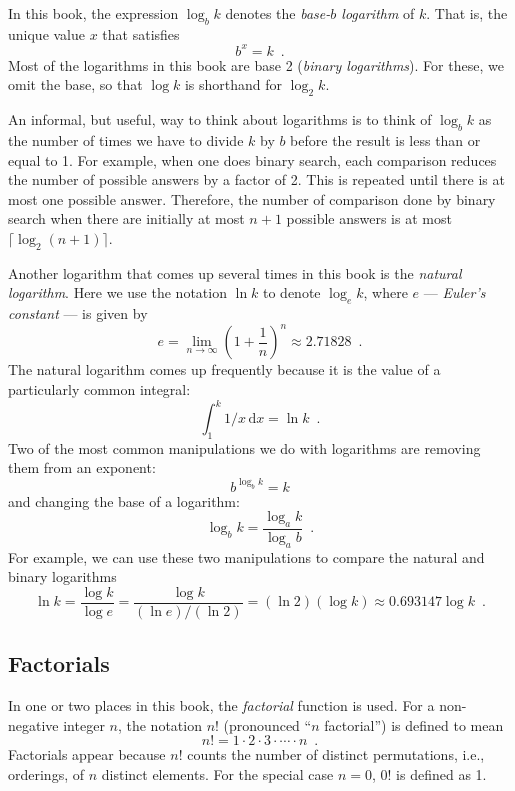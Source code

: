 \documentclass[10pt]{book}
\newcommand{\seclabel}[1]{\label{sec:#1}}
\theoremstyle{plain}
\theoremstyle{definition}
\begin{document}
%
In this book, the expression $\log_b k$ denotes the \emph{base-$b$ logarithm}
of $k$.  That is, the unique value $x$ that satisfies
\[
    b^{x} = k  \enspace .
\]
Most of the logarithms in this book are base 2 (\emph{binary logarithms}).
%
%
For these, we omit the base, so that $\log k$ is shorthand for
$\log_2 k$.

An informal, but useful, way to think about logarithms is to think
of $\log_b k$ as the number of times we have to divide $k$ by $b$
before the result is less than or equal to 1.  For example, when one
does binary search, each comparison reduces the number of possible
answers by a factor of 2.  This is repeated until there is at most one
possible answer.  Therefore, the number of comparison done by binary
search when there are initially at most $n+1$ possible answers is at
most $\lceil\log_2(n+1)\rceil$.

%
%
Another logarithm that comes up several times in this book is the
\emph{natural logarithm}.  Here we use the notation $\ln k$ to denote
$\log_e k$, where $e$ --- \emph{Euler's constant} --- is given by
%
%
\[
   e = \lim_{n\rightarrow\infty} \left(1+\frac{1}{n}\right)^n
   \approx  2.71828 \enspace .
\]
The natural logarithm comes up frequently because it is the value
of a particularly common integral:
\[
    \int_{1}^{k} 1/x\,\mathrm{d}x  = \ln k \enspace .
\]
Two of the most common manipulations we do with logarithms are removing
them from an exponent:
\[
    b^{\log_b k} = k
\]
and changing the base of a logarithm:
\[
    \log_b k = \frac{\log_a k}{\log_a b} \enspace .
\]
For example, we can use these two manipulations to compare the natural and binary logarithms
\[
   \ln k = \frac{\log k}{\log e} = \frac{\log k}{(\ln e)/(\ln 2)} = 
    (\ln 2)(\log k) \approx 0.693147\log k \enspace .
\]

\subsection{Factorials}
\seclabel{factorials}

%
In one or two places in this book, the \emph{factorial} function is used.
For a non-negative integer $n$, the notation $n!$ (pronounced ``$n$ factorial'') is defined to mean 
\[
   n! = 1\cdot2\cdot3\cdot\cdots\cdot n \enspace .
\]
Factorials appear because $n!$ counts the number of distinct
permutations, i.e., orderings, of $n$ distinct elements.
%
For the special case $n=0$, $0!$ is defined as 1. 
\end{document}
